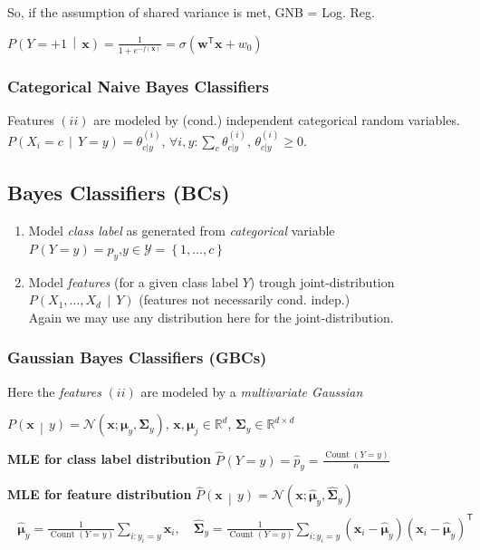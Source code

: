 \documentclass[a4paper,8pt,landscape]{extarticle}
\newcommand{\R}{\mathbb{R}}
\newcommand{\cN}{\mathcal{N}}
\newcommand{\cY}{\mathcal{Y}}
\newcommand{\set}[1]{\left\{ #1 \right\}}
\newcommand{\Prob}[2][]{P_{#1}\left( #2 \right)}
\newcommand{\cProb}[2]{P\left( #1 \,\middle|\, #2 \right)}
\newcommand{\hProb}[2][]{\hat{P}_{#1}\left( #2 \right)}
\newcommand{\chProb}[2]{\hat{P}\left( #1 \,\middle|\, #2 \right)}
\newcommand*{\T}{\mathsf{T}}
\DeclareMathOperator{\Count}{Count}
\newcommand{\mat}[1]{\mathbf{#1}}
\renewcommand{\vec}[1]{\mathbf{#1}}
\newcommand{\vw}{\vec{w}}
\newcommand{\vx}{\vec{x}}
\newcommand{\vmu}{\boldsymbol{\mu}}
\newcommand{\MSigma}{\mat{\Sigma}}
\begin{document}
\begin{multicols*}{3}
So, if the assumption of shared variance is met, GNB = Log. Reg.

$\cProb{Y=+1}{\vx} = \frac{1}{1+e^{-f(\vx)}} = \sigma(\vw^\T\vx+w_0)
$


\subsubsection{Categorical Naive Bayes Classifiers}

Features $(ii)$ are modeled by (cond.) independent categorical
random variables. $\cProb{X_i=c}{Y=y}=\theta^{(i)}_{c|y}$,\quad
$\forall i,y\colon\sum_c\theta^{(i)}_{c|y}$,\quad
$\theta^{(i)}_{c|y}\geq 0$.

\subsection{Bayes Classifiers (BCs)}

\begin{enumerate}[label=(\roman*)]
  \item Model \emph{class label} as generated from \emph{categorical} variable\\
  $\Prob{Y=y}=p_y$,\quad $y\in\cY=\set{1,\ldots,c}$
  \item Model \emph{features} (for a given class label $Y$) trough
  joint-distribution\\
  $\cProb{X_1,\ldots,X_d}{Y}$ (features not necessarily cond. indep.)\\
  Again we may use any distribution here for the joint-distribution.
\end{enumerate}

\subsubsection{Gaussian Bayes Classifiers (GBCs)}

Here the \emph{features} $(ii)$ are modeled by a \emph{multivariate Gaussian}

$\cProb{\vx}{y}=\cN(\vx;\vmu_y,\MSigma_y)$, \quad $\vx,\vmu_j\in\R^d$, \quad
$\MSigma_y\in\R^{d\times d}$

\textbf{MLE for class label distribution} 
$\hProb{Y=y}=\hat{p}_y=\frac{\Count(Y=y)}{n}$

\textbf{MLE for feature distribution}
$\chProb{\vx}{y}=\cN(\vx;\hat{\vmu}_y,\hat{\MSigma}_y)$
\begin{gather*}
\begin{align*}
\hat{\vmu}_y=\frac{1}{\Count(Y=y)}\sum_{i\colon y_i=y}\vx_i,\quad
\hat{\MSigma}_y=\frac{1}{\Count(Y=y)}\sum_{i\colon y_i=y}
(\vx_i-\hat{\vmu}_y)(\vx_i-\hat{\vmu}_y)^\T
\end{align*}
\end{gather*}


\end{multicols*}
\end{document}
